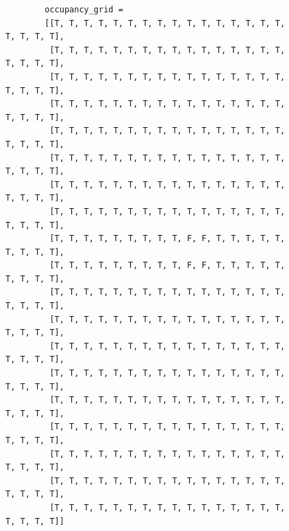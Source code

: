 \begin{figure}[h!]
	\small
	\centering	
	\begin{minipage}{0.46\textwidth}%
	\begin{verbatim}
		occupancy_grid = 
		[[T, T, T, T, T, T, T, T, T, T, T, T, T, T, T, T, T, T, T, T],
		 [T, T, T, T, T, T, T, T, T, T, T, T, T, T, T, T, T, T, T, T],
		 [T, T, T, T, T, T, T, T, T, T, T, T, T, T, T, T, T, T, T, T],
		 [T, T, T, T, T, T, T, T, T, T, T, T, T, T, T, T, T, T, T, T],
		 [T, T, T, T, T, T, T, T, T, T, T, T, T, T, T, T, T, T, T, T],
		 [T, T, T, T, T, T, T, T, T, T, T, T, T, T, T, T, T, T, T, T],
		 [T, T, T, T, T, T, T, T, T, T, T, T, T, T, T, T, T, T, T, T],
		 [T, T, T, T, T, T, T, T, T, T, T, T, T, T, T, T, T, T, T, T],
		 [T, T, T, T, T, T, T, T, T, F, F, T, T, T, T, T, T, T, T, T],
		 [T, T, T, T, T, T, T, T, T, F, F, T, T, T, T, T, T, T, T, T],
		 [T, T, T, T, T, T, T, T, T, T, T, T, T, T, T, T, T, T, T, T],
		 [T, T, T, T, T, T, T, T, T, T, T, T, T, T, T, T, T, T, T, T],
		 [T, T, T, T, T, T, T, T, T, T, T, T, T, T, T, T, T, T, T, T],
		 [T, T, T, T, T, T, T, T, T, T, T, T, T, T, T, T, T, T, T, T],
		 [T, T, T, T, T, T, T, T, T, T, T, T, T, T, T, T, T, T, T, T],
		 [T, T, T, T, T, T, T, T, T, T, T, T, T, T, T, T, T, T, T, T],
		 [T, T, T, T, T, T, T, T, T, T, T, T, T, T, T, T, T, T, T, T],
		 [T, T, T, T, T, T, T, T, T, T, T, T, T, T, T, T, T, T, T, T],
		 [T, T, T, T, T, T, T, T, T, T, T, T, T, T, T, T, T, T, T, T]]
	\end{verbatim}
	\end{minipage}
	\hspace*{\fill}
	\begin{minipage}{0.46\textwidth}%
		\footnotesize

\end{minipage}
\end{figure}
